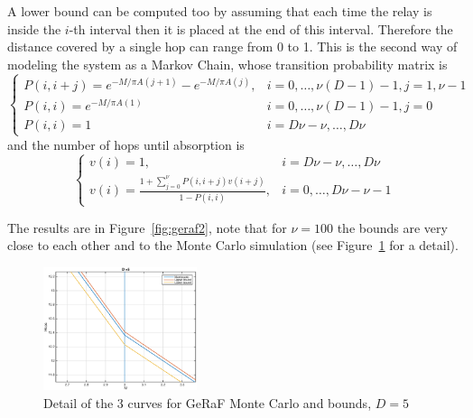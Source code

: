 \documentclass[10pt]{article}
\begin{document}
A lower bound can be computed too by assuming that each time the relay is inside the $i$-th interval then it is placed at the end of this interval. Therefore the distance covered by a single hop can range from 0 to 1. This is the second way of modeling the system as a Markov Chain, whose transition probability matrix is
\begin{equation}
\begin{cases}
  P(i, i + j) = e^{-M/\pi A(j+1)} - e^{-M/\pi A(j)}, & i = 0, \dots, \nu (D - 1) - 1, j = 1, \nu-1 \\
  P(i, i) = e^{-M/\pi A(1)} & i = 0, \dots, \nu (D - 1) - 1, j = 0 \\
  P(i, i) = 1 & i = D\nu - \nu, \dots, D\nu 
\end{cases}
\end{equation}
and the number of hops until absorption is
\begin{equation}
\begin{cases}
  v(i) = 1, & i = D\nu - \nu , \dots, D\nu  \\
  v(i) = \frac{1+\sum_{j = 0}^{\nu} P(i, i + j) v(i + j)}{1-P(i, i)}, & i = 0, \dots, D\nu - \nu - 1
\end{cases}
\end{equation}

The results are in Figure~\ref{fig:geraf2}, note that for $\nu = 100$ the bounds are very close to each other and to the Monte Carlo simulation (see Figure~\ref{fig:geraf3} for a detail).

\begin{figure}[h!]
  \centering
  \includegraphics[width= 0.4\textwidth]{GeRaF_detail}
  \caption{Detail of the 3 curves for GeRaF Monte Carlo and bounds, $D = 5$}
  \label{fig:geraf3}
\end{figure}
\end{document}
